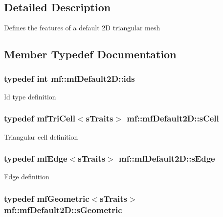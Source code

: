 \subsection{Detailed Description}
Defines the features of a default 2D triangular mesh 

\subsection{Member Typedef Documentation}
\hypertarget{structmf_1_1mfDefault2D_a0c23cfe375bcd646eed0501ca539127d}{
\subsubsection[{ids}]{\setlength{\rightskip}{0pt plus 5cm}typedef int {\bf mf::mfDefault2D::ids}}}
\label{structmf_1_1mfDefault2D_a0c23cfe375bcd646eed0501ca539127d}
Id type definition \hypertarget{structmf_1_1mfDefault2D_a00494a3737ff059da660e6b2448d85e7}{
\subsubsection[{sCell}]{\setlength{\rightskip}{0pt plus 5cm}typedef {\bf mfTriCell}$<${\bf sTraits}$>$ {\bf mf::mfDefault2D::sCell}}}
\label{structmf_1_1mfDefault2D_a00494a3737ff059da660e6b2448d85e7}
Triangular cell definition \hypertarget{structmf_1_1mfDefault2D_aee1699c9233b1e9b0461258cda97dd95}{
\subsubsection[{sEdge}]{\setlength{\rightskip}{0pt plus 5cm}typedef {\bf mfEdge}$<${\bf sTraits}$>$ {\bf mf::mfDefault2D::sEdge}}}
\label{structmf_1_1mfDefault2D_aee1699c9233b1e9b0461258cda97dd95}
Edge definition \hypertarget{structmf_1_1mfDefault2D_a974a8a9297a6c7dbe28a3aae93ec0932}{
\subsubsection[{sGeometric}]{\setlength{\rightskip}{0pt plus 5cm}typedef {\bf mfGeometric}$<${\bf sTraits}$>$ {\bf mf::mfDefault2D::sGeometric}}}
